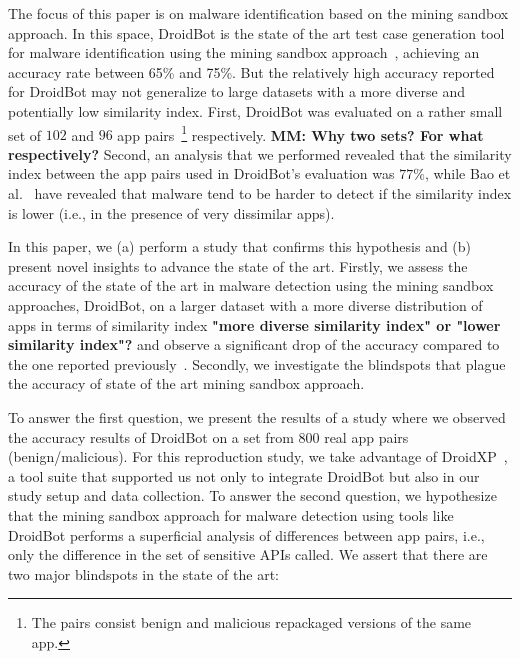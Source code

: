 The focus of this paper is on malware identification based on the mining sandbox approach.
In this space, DroidBot is the state of the art test case generation tool for malware identification using the mining sandbox approach~\cite{DBLP:conf/wcre/BaoLL18,DBLP:journals/jss/CostaMMSSBNR22}, achieving an accuracy rate between 65\% and 75\%. But the relatively high accuracy reported for DroidBot 
may not generalize to large datasets with a more diverse and potentially low similarity index.
First, DroidBot was evaluated on a rather small set of $102$ and $96$ app pairs~\footnote{The pairs consist benign and malicious repackaged versions of the same app.} respectively. \textbf{MM: Why two sets? For what respectively?} Second, an analysis that we performed revealed that the similarity index between the app pairs used in DroidBot's evaluation was $77\%$, while Bao et al.~\cite{DBLP:conf/iceccs/LeB0GL18} %
have revealed that malware tend to be harder to detect if the similarity index is lower 
(i.e., in the presence of very dissimilar apps). 


In this paper, we (a) perform a study that confirms this hypothesis and (b) present novel insights to advance the state of the art. 
Firstly, we assess the accuracy of the state of the art in malware detection using the mining sandbox approaches, DroidBot, on a larger dataset with a more diverse distribution of apps in terms of similarity index \textbf{"more diverse similarity index" or "lower similarity index"?} and observe a significant drop of the accuracy compared to the one reported previously~\cite{DBLP:conf/wcre/BaoLL18,DBLP:journals/jss/CostaMMSSBNR22}.
Secondly, 
we investigate the blindspots that plague the accuracy of state of the art mining sandbox approach. 

To answer the first question, we present the results of a study where we observed the accuracy results of DroidBot on a set from $800$ real app pairs (benign/malicious). For this reproduction study, we take advantage of DroidXP~\cite{DBLP:conf/scam/CostaMCMVBC20}, a tool suite that supported us not only to integrate DroidBot but also in our study setup and data collection. To answer the second question, we hypothesize that the mining sandbox approach for malware detection using tools like DroidBot performs a superficial analysis of differences between app pairs, i.e., only the difference in the set of sensitive APIs called. We assert that there are two major blindspots in the state of the art:

